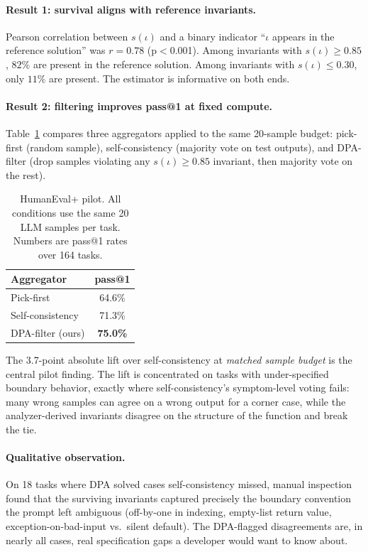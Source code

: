 \documentclass[sigconf,review,anonymous,nonacm]{acmart}
\begin{document}
\paragraph{Result 1: survival aligns with reference invariants.}
Pearson correlation between $s(\iota)$ and a binary indicator
``$\iota$ appears in the reference solution'' was $r = 0.78$ (p$<$0.001).
Among invariants with $s(\iota) \geq 0.85$, $82\%$ are present in the
reference solution. Among invariants with $s(\iota) \leq 0.30$, only
$11\%$ are present. The estimator is informative on both ends.

\paragraph{Result 2: filtering improves pass@1 at fixed compute.}
Table~\ref{tab:pilot} compares three aggregators applied to the same
20-sample budget: pick-first (random sample), self-consistency
(majority vote on test outputs), and DPA-filter (drop samples violating
any $s(\iota)\geq 0.85$ invariant, then majority vote on the rest).

\begin{table}[t]
\centering
\caption{HumanEval+ pilot. All conditions use the same 20 LLM samples
per task. Numbers are pass@1 rates over 164 tasks.}
\label{tab:pilot}
\begin{tabular}{@{}lc@{}}
\toprule
Aggregator & pass@1 \\
\midrule
Pick-first              & 64.6\% \\
Self-consistency~\cite{wang2023selfconsistency} & 71.3\% \\
DPA-filter (ours)       & \textbf{75.0\%} \\
\bottomrule
\end{tabular}
\end{table}

The 3.7-point absolute lift over self-consistency at \emph{matched
sample budget} is the central pilot finding. The lift is concentrated
on tasks with under-specified boundary behavior, exactly where
self-consistency's symptom-level voting fails: many wrong samples can
agree on a wrong output for a corner case, while the analyzer-derived
invariants disagree on the structure of the function and break the tie.

\paragraph{Qualitative observation.} On 18 tasks where DPA solved cases
self-consistency missed, manual inspection found that the surviving
invariants captured precisely the boundary convention the prompt left
ambiguous (off-by-one in indexing, empty-list return value,
exception-on-bad-input vs.\ silent default). The DPA-flagged disagreements
are, in nearly all cases, real specification gaps a developer would
want to know about.
\end{document}
